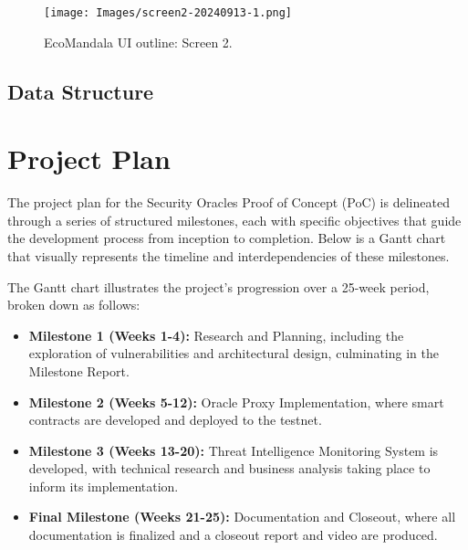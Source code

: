 \documentclass{scrreport}
\begin{document}
\begin{figure}[H]
\centering
\texttt{[image: Images/screen2-20240913-1.png]}
\caption{EcoMandala UI outline: Screen 2.}
\label{fig:ui-screen-2}
\end{figure}

\newpage
\subsection{Data Structure}


\newpage


\section{Project Plan}

The project plan for the Security Oracles Proof of Concept (PoC) is delineated through a series of structured milestones, each with specific objectives that guide the development process from inception to completion. Below is a Gantt chart that visually represents the timeline and interdependencies of these milestones.


The Gantt chart illustrates the project's progression over a 25-week period, broken down as follows:

\begin{itemize}
  \item \textbf{Milestone 1 (Weeks 1-4):} Research and Planning, including the exploration of vulnerabilities and architectural design, culminating in the Milestone Report.
  \item \textbf{Milestone 2 (Weeks 5-12):} Oracle Proxy Implementation, where smart contracts are developed and deployed to the testnet.
  \item \textbf{Milestone 3 (Weeks 13-20):} Threat Intelligence Monitoring System is developed, with technical research and business analysis taking place to inform its implementation.
  \item \textbf{Final Milestone (Weeks 21-25):} Documentation and Closeout, where all documentation is finalized and a closeout report and video are produced.
\end{itemize}
\end{document}
